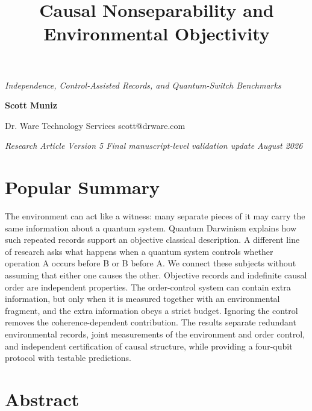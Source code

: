 \documentclass[
]{article}
\title{\textbf{Causal Nonseparability and Environmental Objectivity}}
\author{}
\date{}
\begin{document}
\maketitle

\emph{Independence, Control-Assisted Records, and Quantum-Switch
Benchmarks}

\textbf{Scott Muniz}

Dr. Ware Technology Services \textbar{} scott@drware.com

\emph{Research Article \textbar{} Version 5 \textbar{} Final
manuscript-level validation update \textbar{} August 2026}

\section{Popular Summary}\label{popular-summary}

The environment can act like a witness: many separate pieces of it may
carry the same information about a quantum system. Quantum Darwinism
explains how such repeated records support an objective classical
description. A different line of research asks what happens when a
quantum system controls whether operation A occurs before B or B before
A. We connect these subjects without assuming that either one causes the
other. Objective records and indefinite causal order are independent
properties. The order-control system can contain extra information, but
only when it is measured together with an environmental fragment, and
the extra information obeys a strict budget. Ignoring the control
removes the coherence-dependent contribution. The results separate
redundant environmental records, joint measurements of the environment
and order control, and independent certification of causal structure,
while providing a four-qubit protocol with testable predictions.

\section{Abstract}\label{abstract}
\end{document}
